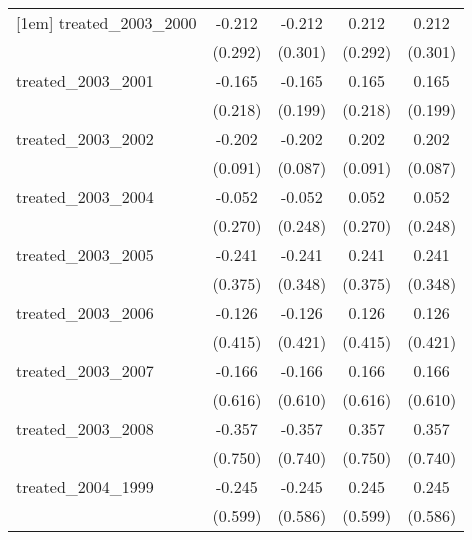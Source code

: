 {\begin{tabular}{l*{4}{c}}
[1em]
treated\_2003\_2000&      -0.212         &      -0.212         &       0.212         &       0.212         \\
            &     (0.292)         &     (0.301)         &     (0.292)         &     (0.301)         \\
[1em]
treated\_2003\_2001&      -0.165         &      -0.165         &       0.165         &       0.165         \\
            &     (0.218)         &     (0.199)         &     (0.218)         &     (0.199)         \\
[1em]
treated\_2003\_2002&      -0.202\sym{*}  &      -0.202\sym{*}  &       0.202\sym{*}  &       0.202\sym{*}  \\
            &     (0.091)         &     (0.087)         &     (0.091)         &     (0.087)         \\
[1em]
treated\_2003\_2004&      -0.052         &      -0.052         &       0.052         &       0.052         \\
            &     (0.270)         &     (0.248)         &     (0.270)         &     (0.248)         \\
[1em]
treated\_2003\_2005&      -0.241         &      -0.241         &       0.241         &       0.241         \\
            &     (0.375)         &     (0.348)         &     (0.375)         &     (0.348)         \\
[1em]
treated\_2003\_2006&      -0.126         &      -0.126         &       0.126         &       0.126         \\
            &     (0.415)         &     (0.421)         &     (0.415)         &     (0.421)         \\
[1em]
treated\_2003\_2007&      -0.166         &      -0.166         &       0.166         &       0.166         \\
            &     (0.616)         &     (0.610)         &     (0.616)         &     (0.610)         \\
[1em]
treated\_2003\_2008&      -0.357         &      -0.357         &       0.357         &       0.357         \\
            &     (0.750)         &     (0.740)         &     (0.750)         &     (0.740)         \\
[1em]
treated\_2004\_1999&      -0.245         &      -0.245         &       0.245         &       0.245         \\
            &     (0.599)         &     (0.586)         &     (0.599)         &     (0.586)         \\

\end{tabular}}

